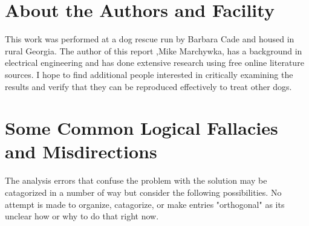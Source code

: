 \documentclass[aps,secnumarabic,balancelastpage,amsmath,amssymb,nofootinbib]{revtex4}
\newlength{\picwidth}  \setlength{\picwidth}{.4\textwidth }
\newcommand{\mjmed}[1]{
[ mjm : #1   ]
}
\begin{document}
\begin{mdpicomment}
\section{About the Authors and Facility}
This work was performed at a dog rescue run by Barbara Cade and
housed in rural Georgia.  The author of this report 
,Mike Marchywka,
has a background in electrical engineering and 
has done extensive research using free online literature sources.  
I hope to find additional people interested in critically 
examining the results and verify that they can be reproduced
effectively to treat other dogs.

\begin{comment}
\begin{figure}[htb] 
\centering
\mjmed{ picture commented out to save space in drafts...  } 
\caption{ 
 }
\end{figure}

\end{comment}



\section{Some Common Logical Fallacies and Misdirections}
\label{appendix:errors}

The analysis errors that confuse the problem with the
solution may be catagorized in a number of way but
consider the following possibilities. No attempt is made
to organize, catagorize, or make entries "orthogonal"
as its unclear how or why to do that right now.  


\end{mdpicomment}
\end{document}
